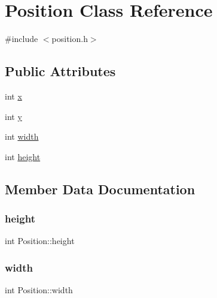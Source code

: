 \hypertarget{class_position}{}\section{Position Class Reference}
\label{class_position}


{\ttfamily \#include $<$position.\+h$>$}

\subsection*{Public Attributes}
\begin{DoxyCompactItemize}
\item 
int \mbox{\hyperlink{class_position_aeda152ffeee17ae5be9c02327b2408d8}{x}}
\item 
int \mbox{\hyperlink{class_position_a3c08e9213d4726b21caba3073192c4a3}{y}}
\item 
int \mbox{\hyperlink{class_position_a76e176be3a6b98cfa339595a2cdee053}{width}}
\item 
int \mbox{\hyperlink{class_position_a59dee03301ad7c8d477790560e98d597}{height}}
\end{DoxyCompactItemize}


\subsection{Member Data Documentation}
\mbox{\label{class_position_a59dee03301ad7c8d477790560e98d597}} 
\subsubsection{\texorpdfstring{height}{height}}
{\footnotesize\ttfamily int Position\+::height}

\mbox{\label{class_position_a76e176be3a6b98cfa339595a2cdee053}} 
\subsubsection{\texorpdfstring{width}{width}}
{\footnotesize\ttfamily int Position\+::width}

\mbox{\label{class_position_aeda152ffeee17ae5be9c02327b2408d8}} 
